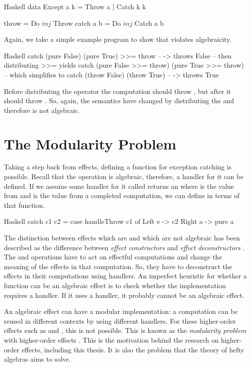 \begin{lst}{Haskell}
data Except a k = Throw a | Catch k k

throw     = Do $ inj $ Throw
catch a b = Do $ inj $ Catch a b
\end{lst}
%
Again, we take a simple example program to show that  violates algebraicity.

\begin{lst}{Haskell}
catch (pure False)  (pure True) >>= throw -- -> throws False
-- then distributing >>= yields
catch
  (pure False >>= throw)
  (pure True >>= throw)
-- which simplifies to
catch (throw False) (throw True)          -- -> throws True
\end{lst}
%
Before distributing the \hs{>>=} operator the computation should throw , but after it should throw . So, again, the semantics have changed by distributing the \hs{>>=} and therefore  is not algebraic.

\section{The Modularity Problem}

Taking a step back from effects, defining a function for exception catching is possible. Recall that the  operation is algebraic, therefore, a handler for it can be defined. If we assume some handler for it called  returns an  where  is the value from  and  is the value from a completed computation, we can define  in terms of that function.

\begin{lst}{Haskell}
catch c1 c2 =
  case handleThrow c1 of
    Left e -> c2
    Right a -> pure a
\end{lst}
%
The distinction between effects which are and which are not algebraic has been described as the difference between \emph{effect constructors} and \emph{effect deconstructors} \autocite{plotkin_algebraic_2003}. The  and  operations have to act on effectful computations and change the meaning of the effects in that computation. So, they have to deconstruct the effects in their computations using handlers. An imperfect heuristic for whether a function can be an algebraic effect is to check whether the implementation requires a handler. If it uses a handler, it probably cannot be an algebraic effect.

An algebraic effect can have a modular implementation: a computation can be reused in different contexts by using different handlers. For these higher-order effects such as  and , this is not possible. This is known as the \emph{modularity problem} with higher-order effects \autocite{wu_effect_2014}. This is the motivation behind the research on higher-order effects, including this thesis. It is also the problem that the theory of hefty algebras aims to solve.

